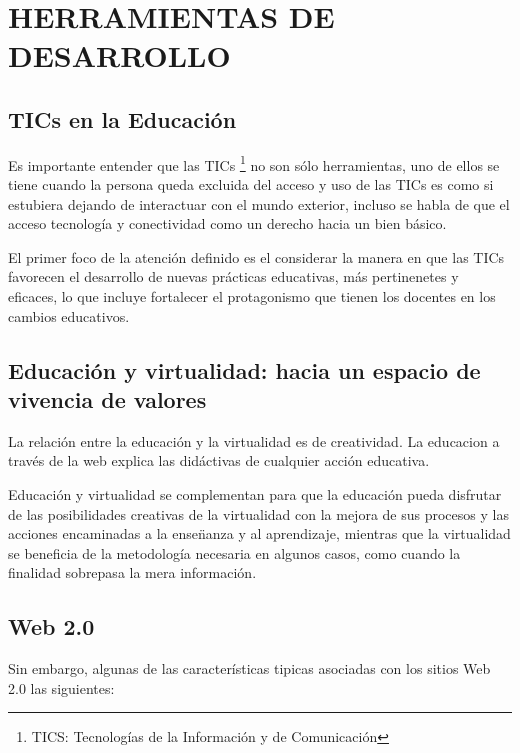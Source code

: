 \chapter{HERRAMIENTAS DE DESARROLLO}

\section{TICs en la Educaci\'{o}n}

Es importante entender que las TICs \footnote{TICS: Tecnolog\'{i}as de la Informaci\'{o}n y de Comunicaci\'{o}n}
no son s\'{o}lo herramientas, uno de ellos se tiene cuando la persona queda excluida del acceso y uso de las
TICs es como si estubiera dejando de interactuar con el mundo exterior, incluso se habla de que el acceso 
tecnolog\'{i}a y conectividad como un derecho hacia un bien b\'{a}sico.

El primer foco de la atención definido es el considerar la manera en que las TICs favorecen el desarrollo
de nuevas prácticas educativas, más pertinenetes y eficaces, lo que incluye fortalecer el protagonismo 
que tienen los docentes en los cambios educativos.\cite{severin2013enfoques}

\section{Educaci\'{o}n y virtualidad: hacia un espacio de vivencia de valores}

La relaci\'{o}n entre la educaci\'{o}n y la virtualidad es de creatividad. La educacion a trav\'{e}s de la
web explica las did\'{a}ctivas de cualquier acci\'{o}n educativa. 

Educaci\'{o}n y virtualidad se complementan para que la educaci\'{o}n pueda disfrutar de las posibilidades 
creativas de la virtualidad con la mejora de sus procesos y las acciones encaminadas a la ense\"{n}anza y al
aprendizaje, mientras que la virtualidad se beneficia de la metodolog\'{i}a necesaria en algunos casos, como
cuando la finalidad sobrepasa la mera informaci\'{o}n.\cite{duart2000aprender}

\section{Web 2.0}

Sin embargo, algunas de las caracter\'{i}sticas tipicas asociadas con los sitios Web 2.0 las siguientes:\cite{zervaas2007practical}

